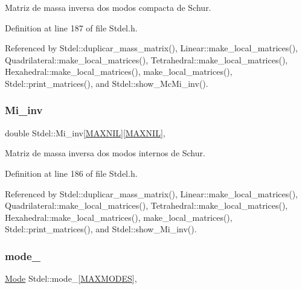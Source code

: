 Matriz de massa inversa dos modos compacta de Schur. 



Definition at line 187 of file Stdel.\+h.



Referenced by Stdel\+::duplicar\+\_\+mass\+\_\+matrix(), Linear\+::make\+\_\+local\+\_\+matrices(), Quadrilateral\+::make\+\_\+local\+\_\+matrices(), Tetrahedral\+::make\+\_\+local\+\_\+matrices(), Hexahedral\+::make\+\_\+local\+\_\+matrices(), make\+\_\+local\+\_\+matrices(), Stdel\+::print\+\_\+matrices(), and Stdel\+::show\+\_\+\+Mc\+Mi\+\_\+inv().

\mbox{\label{classStdel_a53a9490d5a02a96473d96848bac3711a}} 
\subsubsection{\texorpdfstring{Mi\+\_\+inv}{Mi\_inv}}
{\footnotesize\ttfamily double Stdel\+::\+Mi\+\_\+inv\mbox{[}\hyperlink{MyOptions_8h_a463cdf068fb6289d1f81dac7e0f76ab5}{M\+A\+X\+N\+IL}\mbox{]}\mbox{[}\hyperlink{MyOptions_8h_a463cdf068fb6289d1f81dac7e0f76ab5}{M\+A\+X\+N\+IL}\mbox{]}\hspace{0.3cm}{\ttfamily [protected]}, {\ttfamily [inherited]}}



Matriz de massa inversa dos modos internos de Schur. 



Definition at line 186 of file Stdel.\+h.



Referenced by Stdel\+::duplicar\+\_\+mass\+\_\+matrix(), Linear\+::make\+\_\+local\+\_\+matrices(), Quadrilateral\+::make\+\_\+local\+\_\+matrices(), Tetrahedral\+::make\+\_\+local\+\_\+matrices(), Hexahedral\+::make\+\_\+local\+\_\+matrices(), make\+\_\+local\+\_\+matrices(), Stdel\+::print\+\_\+matrices(), and Stdel\+::show\+\_\+\+Mi\+\_\+inv().

\mbox{\label{classStdel_a7a09cf048f14496813a914ca6afe7366}} 
\subsubsection{\texorpdfstring{mode\+\_\+}{mode\_}}
{\footnotesize\ttfamily \hyperlink{classMode}{Mode} Stdel\+::mode\+\_\+\mbox{[}\hyperlink{MyOptions_8h_aa75ccd382acf88cec3e9c8025c1f88b7}{M\+A\+X\+M\+O\+D\+ES}\mbox{]}\hspace{0.3cm}{\ttfamily [protected]}, {\ttfamily [inherited]}}



